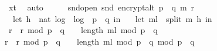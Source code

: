 \begin{isabellebody}
\ \ x{\isacharunderscore}{\kern0pt}t{\isacharprime}{\kern0pt}{\isacharparenright}{\kern0pt}{\isachardoublequoteclose}\ \isamarkupfalse%
\ auto\isanewline
\isanewline
\ \ \isamarkupfalse%
\ \isamarkupfalse%
\ snd{\isacharunderscore}{\kern0pt}open{\isacharcolon}{\kern0pt}\ {\isachardoublequoteopen}snd\ {\isacharparenleft}{\kern0pt}encrypt{\isacharunderscore}{\kern0pt}alt\ {\isacharparenleft}{\kern0pt}p\ {\isacharasterisk}{\kern0pt}\ q{\isacharparenright}{\kern0pt}\ m\ r{\isacharparenright}{\kern0pt}\ \isanewline
\ \ {\isacharequal}{\kern0pt}\ {\isacharparenleft}{\kern0pt}let\ h\ {\isacharequal}{\kern0pt}\ nat\ {\isasymlfloor}log\ {}\ {\isacharparenleft}{\kern0pt}log\ {}\ {\isacharparenleft}{\kern0pt}p\ {\isacharasterisk}{\kern0pt}\ q{\isacharparenright}{\kern0pt}{\isacharparenright}{\kern0pt}{\isasymrfloor}\ in\ \isanewline
\ \ let\ m{\isacharunderscore}{\kern0pt}l\ {\isacharequal}{\kern0pt}\ split\ m\ h\ in\ \ \isanewline
\ \ {\isacharparenleft}{\kern0pt}{\isacharparenleft}{\kern0pt}{\isacharparenleft}{\kern0pt}{\isacharparenleft}{\kern0pt}r\ {\isacharasterisk}{\kern0pt}\ r{\isacharparenright}{\kern0pt}\ mod\ {\isacharparenleft}{\kern0pt}p\ {\isacharasterisk}{\kern0pt}\ q{\isacharparenright}{\kern0pt}{\isacharparenright}{\kern0pt}\ {\isacharcircum}{\kern0pt}\ {\isacharparenleft}{\kern0pt}{}\ {\isacharcircum}{\kern0pt}\ {\isacharparenleft}{\kern0pt}length\ m{\isacharunderscore}{\kern0pt}l{\isacharparenright}{\kern0pt}{\isacharparenright}{\kern0pt}\ mod\ {\isacharparenleft}{\kern0pt}p\ {\isacharasterisk}{\kern0pt}\ q{\isacharparenright}{\kern0pt}{\isacharparenright}{\kern0pt}\ \isanewline
{\isacharasterisk}{\kern0pt}\ {\isacharparenleft}{\kern0pt}{\isacharparenleft}{\kern0pt}{\isacharparenleft}{\kern0pt}r\ {\isacharasterisk}{\kern0pt}\ r{\isacharparenright}{\kern0pt}\ mod\ {\isacharparenleft}{\kern0pt}p\ {\isacharasterisk}{\kern0pt}\ q{\isacharparenright}{\kern0pt}{\isacharparenright}{\kern0pt}\ {\isacharcircum}{\kern0pt}\ {\isacharparenleft}{\kern0pt}{}\ {\isacharcircum}{\kern0pt}\ {\isacharparenleft}{\kern0pt}length\ m{\isacharunderscore}{\kern0pt}l{\isacharparenright}{\kern0pt}{\isacharparenright}{\kern0pt}\ mod\ {\isacharparenleft}{\kern0pt}p\ {\isacharasterisk}{\kern0pt}\ q{\isacharparenright}{\kern0pt}{\isacharparenright}{\kern0pt}{\isacharparenright}{\kern0pt}{\isacharparenright}{\kern0pt}\ mod\ {\isacharparenleft}{\kern0pt}p\ {\isacharasterisk}{\kern0pt}\ q{\isacharparenright}{\kern0pt}{\isachardoublequoteclose}\ \isanewline
\ \ \ \ \isamarkupfalse%

\end{isabellebody}
